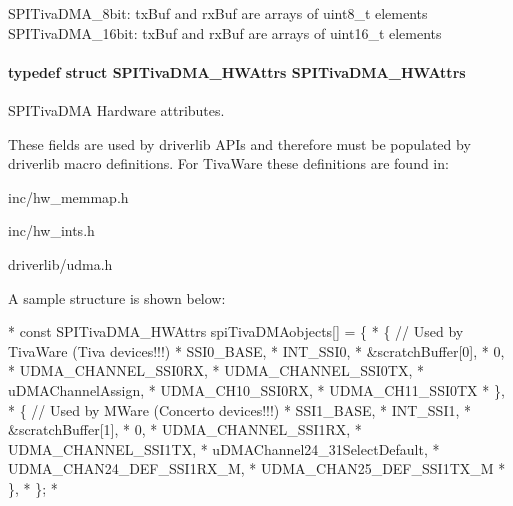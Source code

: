 S\-P\-I\-Tiva\-D\-M\-A\-\_\-8bit\-: tx\-Buf and rx\-Buf are arrays of uint8\-\_\-t elements S\-P\-I\-Tiva\-D\-M\-A\-\_\-16bit\-: tx\-Buf and rx\-Buf are arrays of uint16\-\_\-t elements 
\paragraph[{S\-P\-I\-Tiva\-D\-M\-A\-\_\-\-H\-W\-Attrs}]{\setlength{\rightskip}{0pt plus 5cm}typedef struct {\bf S\-P\-I\-Tiva\-D\-M\-A\-\_\-\-H\-W\-Attrs}  {\bf S\-P\-I\-Tiva\-D\-M\-A\-\_\-\-H\-W\-Attrs}}\label{_s_p_i_tiva_d_m_a_8h_ab2566f4cb348d144220085b8fad1dee6}


S\-P\-I\-Tiva\-D\-M\-A Hardware attributes. 

These fields are used by driverlib A\-P\-Is and therefore must be populated by driverlib macro definitions. For Tiva\-Ware these definitions are found in\-:
\begin{DoxyItemize}
\item inc/hw\-\_\-memmap.\-h
\item inc/hw\-\_\-ints.\-h
\item driverlib/udma.\-h
\end{DoxyItemize}

A sample structure is shown below\-: 
\begin{DoxyCode}
*  \textcolor{keyword}{const} SPITivaDMA_HWAttrs spiTivaDMAobjects[] = \{
*      \{   \textcolor{comment}{// Used by TivaWare (Tiva devices!!!)}
*          SSI0\_BASE,
*          INT\_SSI0,
*          &scratchBuffer[0],
*          0,
*          UDMA\_CHANNEL\_SSI0RX,
*          UDMA\_CHANNEL\_SSI0TX,
*          uDMAChannelAssign,
*          UDMA\_CH10\_SSI0RX,
*          UDMA\_CH11\_SSI0TX
*      \},
*      \{   \textcolor{comment}{// Used by MWare (Concerto devices!!!)}
*          SSI1\_BASE,
*          INT\_SSI1,
*          &scratchBuffer[1],
*          0,
*          UDMA\_CHANNEL\_SSI1RX,
*          UDMA\_CHANNEL\_SSI1TX,
*          uDMAChannel24\_31SelectDefault,
*          UDMA\_CHAN24\_DEF\_SSI1RX\_M,
*          UDMA\_CHAN25\_DEF\_SSI1TX\_M
*      \},
*  \};
*  
\end{DoxyCode}
